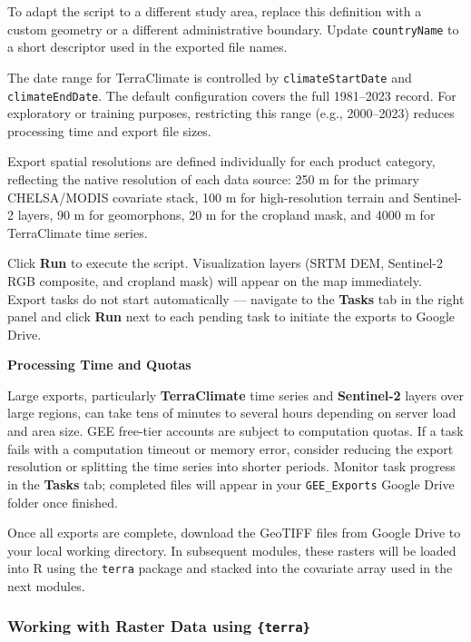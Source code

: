 \documentclass[
  10pt,
  b5paper,
  oneside]{book}
\begin{document}
To adapt the script to a different study area, replace this definition with a custom geometry or a different administrative boundary. Update \texttt{countryName} to a short descriptor used in the exported file names.

The date range for TerraClimate is controlled by \texttt{climateStartDate} and \texttt{climateEndDate}. The default configuration covers the full 1981--2023 record. For exploratory or training purposes, restricting this range (e.g., 2000--2023) reduces processing time and export file sizes.

Export spatial resolutions are defined individually for each product category, reflecting the native resolution of each data source: 250 m for the primary CHELSA/MODIS covariate stack, 100 m for high-resolution terrain and Sentinel-2 layers, 90 m for geomorphons, 20 m for the cropland mask, and 4000 m for TerraClimate time series.

Click \textbf{Run} to execute the script. Visualization layers (SRTM DEM, Sentinel-2 RGB composite, and cropland mask) will appear on the map immediately. Export tasks do not start automatically --- navigate to the \textbf{Tasks} tab in the right panel and click \textbf{Run} next to each pending task to initiate the exports to Google Drive.

\textbf{Processing Time and Quotas}

Large exports, particularly \textbf{TerraClimate} time series and \textbf{Sentinel-2} layers over large regions, can take tens of minutes to several hours depending on server load and area size. GEE free-tier accounts are subject to computation quotas. If a task fails with a computation timeout or memory error, consider reducing the export resolution or splitting the time series into shorter periods. Monitor task progress in the \textbf{Tasks} tab; completed files will appear in your \texttt{GEE\_Exports} Google Drive folder once finished.

Once all exports are complete, download the GeoTIFF files from Google Drive to your local working directory. In subsequent modules, these rasters will be loaded into R using the \texttt{terra} package and stacked into the covariate array used in the next modules.

\subsubsection{\texorpdfstring{Working with Raster Data using \texttt{\{terra\}}}{Working with Raster Data using \{terra\}}}\label{working-with-raster-data-using-terra}
\end{document}
